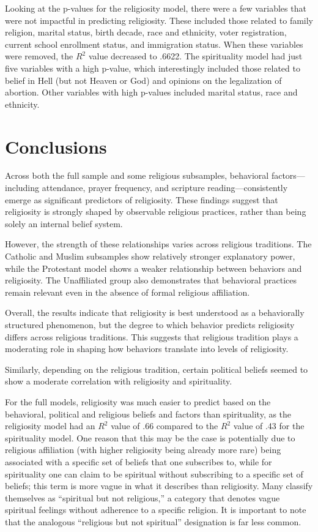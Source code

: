 \documentclass[
]{article}
\begin{document}
Looking at the p-values for the religiosity model, there were a few
variables that were not impactful in predicting religiosity. These
included those related to family religion, marital status, birth decade,
race and ethnicity, voter registration, current school enrollment
status, and immigration status. When these variables were removed, the
\(R^2\) value decreased to .6622. The spirituality model had just five
variables with a high p-value, which interestingly included those
related to belief in Hell (but not Heaven or God) and opinions on the
legalization of abortion. Other variables with high p-values included
marital status, race and ethnicity.

\section{Conclusions}\label{conclusions}

Across both the full sample and some religious subsamples, behavioral
factors---including attendance, prayer frequency, and scripture
reading---consistently emerge as significant predictors of religiosity.
These findings suggest that religiosity is strongly shaped by observable
religious practices, rather than being solely an internal belief system.

However, the strength of these relationships varies across religious
traditions. The Catholic and Muslim subsamples show relatively stronger
explanatory power, while the Protestant model shows a weaker
relationship between behaviors and religiosity. The Unaffiliated group
also demonstrates that behavioral practices remain relevant even in the
absence of formal religious affiliation.

Overall, the results indicate that religiosity is best understood as a
behaviorally structured phenomenon, but the degree to which behavior
predicts religiosity differs across religious traditions. This suggests
that religious tradition plays a moderating role in shaping how
behaviors translate into levels of religiosity.

Similarly, depending on the religious tradition, certain political
beliefs seemed to show a moderate correlation with religiosity and
spirituality.

For the full models, religiosity was much easier to predict based on the
behavioral, political and religious beliefs and factors than
spirituality, as the religiosity model had an \(R^2\) value of .66
compared to the \(R^2\) value of .43 for the spirituality model. One
reason that this may be the case is potentially due to religious
affiliation (with higher religiosity being already more rare) being
associated with a specific set of beliefs that one subscribes to, while
for spirituality one can claim to be spiritual without subscribing to a
specific set of beliefs; this term is more vague in what it describes
than religiosity. Many classify themselves as ``spiritual but not
religious,'' a category that denotes vague spiritual feelings without
adherence to a specific religion. It is important to note that the
analogous ``religious but not spiritual'' designation is far less
common.
\end{document}
